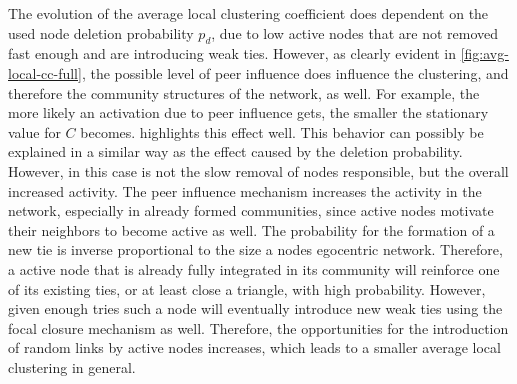 The evolution of the average local clustering coefficient does dependent on the used node deletion probability \( p_{d} \), due to low active nodes that are not removed fast enough and are introducing weak ties.
However, as clearly evident in \cref{fig:avg-local-cc-full}, the possible level of peer influence does influence the clustering, and therefore the community structures of the network, as well.
For example, the more likely an activation due to peer influence gets, the smaller the stationary value for \( C \) becomes.
 highlights this effect well.
This behavior can possibly be explained in a similar way as the effect caused by the deletion probability.
However, in this case is not the slow removal of nodes responsible, but the overall increased activity.
The peer influence mechanism increases the activity in the network, especially in already formed communities, since active nodes motivate their neighbors to become active as well.
The probability for the formation of a new tie is inverse proportional to the size a nodes egocentric network.
Therefore, a active node that is already fully integrated in its community will reinforce one of its existing ties, or at least close a triangle, with high probability.
However, given enough tries such a node will eventually introduce new weak ties using the focal closure mechanism as well.
Therefore, the opportunities for the introduction of random links by active nodes increases, which leads to a smaller average local clustering in general.

